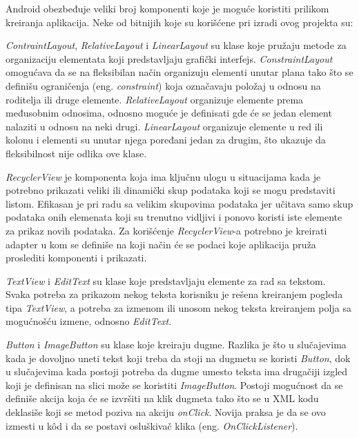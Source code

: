 \documentclass[implementacija.tex]{subfiles}
\begin{document}
Android obezbeđuje veliki broj komponenti koje je moguće koristiti prilikom kreiranja aplikacija. Neke od bitnijih koje su korišćene pri izradi ovog projekta su:
\begin{description}
    \item \textit{ContraintLayout}, \textit{RelativeLayout} i \textit{LinearLayout} su klase koje pružaju metode za organizaciju elementata koji predstavljaju grafički interfejs. \textit{ConstraintLayout} omogućava da se na fleksibilan način organizuju elementi unutar plana tako što se definišu ograničenja (eng. \textit{constraint}) koja označavaju položaj u odnosu na roditelja ili druge elemente. \textit{RelativeLayout} organizuje elemente prema međusobnim odnosima, odnosno moguće je definisati gde će se jedan element nalaziti u odnosu na neki drugi. \textit{LinearLayout} organizuje elemente u red ili kolonu i elementi su unutar njega poređani jedan za drugim, što ukazuje da fleksibilnost nije odlika ove klase.
    \item \textit{RecyclerView} je komponenta koja ima ključnu ulogu u situacijama  kada je potrebno prikazati veliki ili dinamički skup podataka koji se mogu predstaviti listom. Efikasan je pri radu sa velikim skupovima podataka jer učitava samo skup podataka onih elemenata koji su trenutno vidljivi i ponovo koristi iste elemente za prikaz novih podataka. Za korišćenje \textit{RecyclerView}-a potrebno je kreirati adapter u kom se definiše na koji način će se podaci koje aplikacija pruža proslediti komponenti i prikazati. 
    \item \textit{TextView} i \textit{EditText} su klase koje predstavljaju elemente za rad sa tekstom. Svaka potreba za prikazom nekog teksta korisniku je rešena kreiranjem pogleda tipa \textit{TextView}, a potreba za izmenom ili unosom nekog teksta kreiranjem polja sa mogućnošću izmene, odnosno \textit{EditText}.
    \item \textit{Button} i \textit{ImageButton} su klase koje kreiraju dugme. Razlika je što u slučajevima kada je dovoljno uneti tekst koji treba da stoji na dugmetu se koristi \textit{Button}, dok u slučajevima kada postoji potreba da dugme umesto teksta ima drugačiji izgled koji je definisan na slici može se koristiti \textit{ImageButton}. Postoji mogućnost da se definiše akcija koja će se izvršiti na klik dugmeta tako što se u XML kodu deklasiše koji se metod poziva na akciju \textit{onClick}. Novija praksa je da se ovo izmesti u k\^{o}d i da se postavi osluškivač klika (eng. \textit{OnClickListener}).
\end{description}
\end{document}
